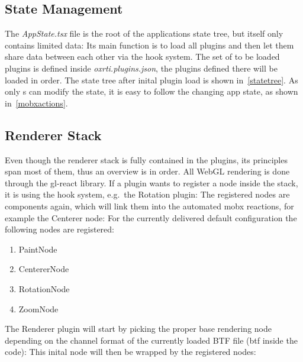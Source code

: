 \subsection{State Management}\label{sec_state}
The \emph{AppState.tsx} file is the root of the applications state tree, but
itself only contains limited data:
Its main function is to load all plugins and then let them share data between
each other via the hook system. The set of to be loaded plugins is defined inside
\emph{oxrti.plugins.json}, the plugins defined there will be loaded in order.
The state tree after inital plugin load is shown in~\autoref{statetree}.
As only s can modify the state, it is easy to follow the changing
app state, as shown in~\autoref{mobxactions}.

\subsection{Renderer Stack}\label{sec_rendererstack}
Even though the renderer stack is fully contained in the plugins, its principles
span most of them, thus an overview is in order. All WebGL rendering is done
through the gl-react library. If a plugin wants to register a node inside the
stack, it is using the hook system, e.g.\ the Rotation plugin:
The registered nodes are components again, which will link them into the
automated mobx reactions, for example the Centerer node:
For the currently delivered default configuration the following nodes are
registered:
\begin{enumerate}
\item PaintNode
\item CentererNode
\item RotationNode
\item ZoomNode
\end{enumerate}
The Renderer plugin will start by picking the proper base rendering node
depending on the channel format of the currently loaded BTF file (btf inside the
code):
This inital node will then be wrapped by the registered nodes:



